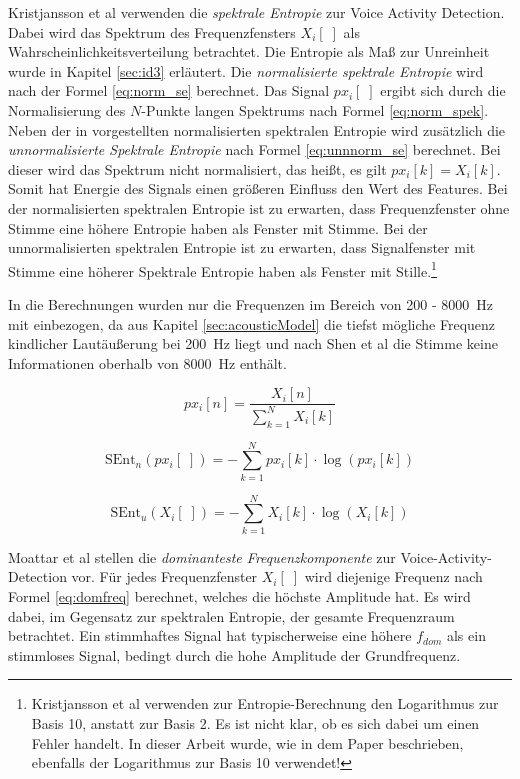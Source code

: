 Kristjansson et al \cite[S. 2]{vad_Lisboa} verwenden die \emph{spektrale Entropie} zur Voice Activity Detection. Dabei wird das Spektrum des Frequenzfensters $X_i[\;]$ als Wahrscheinlichkeitsverteilung betrachtet. Die Entropie als Maß zur \glqq Unreinheit\grqq{} wurde in Kapitel \ref{sec:id3} erläutert. Die \emph{normalisierte spektrale Entropie} wird nach der Formel \ref{eq:norm_se} berechnet. Das Signal $px_i[\;]$ ergibt sich durch die Normalisierung des $N$-Punkte langen Spektrums nach Formel \ref{eq:norm_spek}. Neben der in \cite{vad_Lisboa} vorgestellten normalisierten spektralen Entropie wird zusätzlich die \emph{unnormalisierte Spektrale Entropie} nach Formel \ref{eq:unnnorm_se} berechnet. Bei dieser wird das Spektrum nicht normalisiert, das heißt, es gilt $px_i[k] = X_i[k]$. Somit hat Energie des Signals einen größeren Einfluss den Wert des Features. Bei der normalisierten spektralen Entropie ist zu erwarten, dass Frequenzfenster ohne Stimme eine höhere Entropie haben als Fenster mit Stimme. Bei der unnormalisierten spektralen Entropie ist zu erwarten, dass Signalfenster mit Stimme eine höherer Spektrale Entropie haben als Fenster mit Stille.\footnote{Kristjansson et al \cite[S. 2]{vad_Lisboa} verwenden zur Entropie-Berechnung den Logarithmus zur Basis 10, anstatt zur Basis 2. Es ist nicht klar, ob es sich dabei um einen Fehler handelt. In dieser Arbeit wurde, wie in dem Paper beschrieben, ebenfalls der Logarithmus zur Basis 10 verwendet!}

In die Berechnungen wurden nur die Frequenzen im Bereich von 200 - \SI{8000}{\hertz} mit einbezogen, da aus Kapitel \ref{sec:acousticModel} die tiefst mögliche Frequenz kindlicher Lautäußerung bei \SI{200}{\hertz} liegt und nach Shen et al \cite{vad_entropie02} die Stimme keine Informationen oberhalb von \SI{8000}{\hertz} enthält.

\begin{equation}
px_i[n] = \frac{X_i[n]}{\sum_{k=1}^{N} X_i[k]}
\label{eq:norm_spek}
\end{equation}

\begin{equation}
\text{SEnt}_n(px_i[\;]) = -\sum_{k=1}^{N}px_i[k] \cdot\log(px_i[k])
\label{eq:norm_se}
\end{equation}

\begin{equation}
\text{SEnt}_u(X_i[\;]) = -\sum_{k=1}^{N}X_i[k] \cdot\log(X_i[k])
\label{eq:unnnorm_se}
\end{equation}

Moattar et al \cite[S. 2550]{vad_Easy} stellen die \emph{dominanteste Frequenzkomponente} zur Voice-Activity-Detection vor. Für jedes Frequenzfenster $X_i[\;]$ wird diejenige Frequenz nach Formel \ref{eq:domfreq} berechnet, welches die höchste Amplitude hat. Es wird dabei, im Gegensatz zur spektralen Entropie, der gesamte Frequenzraum betrachtet. Ein stimmhaftes Signal hat typischerweise eine höhere $f_{dom}$ als ein stimmloses Signal, bedingt durch die hohe Amplitude der Grundfrequenz.

